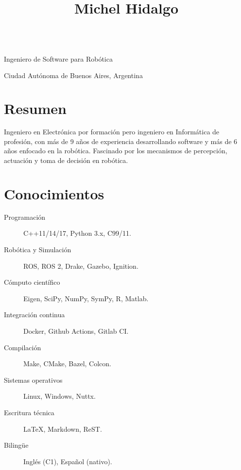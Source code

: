 \documentclass[spanish, letterpaper]{resume}
\begin{document}
\begin{center}
  \title{Michel Hidalgo} \\
  Ingeniero de Software para Robótica \\
  \address{Buenos Aires}{
    Ciudad Autónoma de Buenos Aires,
    Argentina} \\
  \begin{inlined}
    \item {}
    \item {}
    \item {}
  \end{inlined}
\end{center}

\section*{Resumen}

Ingeniero en Electrónica por formación pero ingeniero en Informática de profesión, con más de 9 años de experiencia desarrollando software y más de 6 años enfocado en la robótica. Fascinado por los mecanismos de percepción, actuación y toma de decisión en robótica.

\section*{Conocimientos}

\hfill
\begin{minipage}{0.55\linewidth}
  \begin{description}
    \item[Programación] C++11/14/17, Python 3.x, C99/11.
    \item[Robótica y Simulación] ROS, ROS 2, Drake, Gazebo, Ignition.
    \item[Cómputo científico] Eigen, SciPy, NumPy, SymPy, R, Matlab.
    \item[Integración continua] Docker, Github Actions, Gitlab CI.
  \end{description}
\end{minipage}\hfill
\begin{minipage}{0.4\linewidth}
  \begin{description}
    \item[Compilación] Make, CMake, Bazel, Colcon.
    \item[Sistemas operativos] Linux, Windows, Nuttx.
    \item[Escritura técnica] La\TeX, Markdown, ReST.
    \item[Bilingüe] Inglés (C1), Español (nativo).
  \end{description}
\end{minipage}
\hfill
\end{document}
